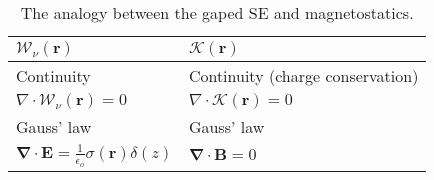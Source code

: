 \documentclass[12pt, a4paper]{article}
\begin{document}
\begin{table}[h]
\begin{minipage}{.95\textwidth}
\begin{center}
\begin{tabular}{ | p{7cm} | p{7cm} | }
				$\boldsymbol{\mathscr{W}}_{\nu}(\boldsymbol{r})$
				                                                                                                                                                                                                                                            & $\boldsymbol{\mathscr{K}}(\boldsymbol{r})$                                                                                                                                                                                \\ \hline
				Continuity                                                                                                                                                                                                                                  & Continuity (charge conservation)                                                                                                                                                                                          \\
				$\nabla \cdot \boldsymbol{\mathscr{W}}_{\nu}(\boldsymbol{r}) = 0 $
				                                                                                                                                                                                                                                            & $\nabla \cdot \boldsymbol{\mathscr{K}}(\boldsymbol{r}) = 0$                                                                                                                                                               \\\hline
				Gauss' law                                                                                                                                                                                                                                  & Gauss' law                                                                                                                                                                                                                \\
				$\boldsymbol{\nabla}\cdot\boldsymbol{E} = \frac{1}{\epsilon_o}\sigma(\boldsymbol{r})\delta(z)$
				                                                                                                                                                                                                                                            & $\boldsymbol{\nabla}\cdot\boldsymbol{B}=0$                                                                                                                                                                                \\
				\hline
			\end{tabular}
			\caption {The analogy between the gaped SE and magnetostatics.}
			\label{analogiesTableEq}
		\end{center}
	\end{minipage}%
\end{table}
\end{document}
